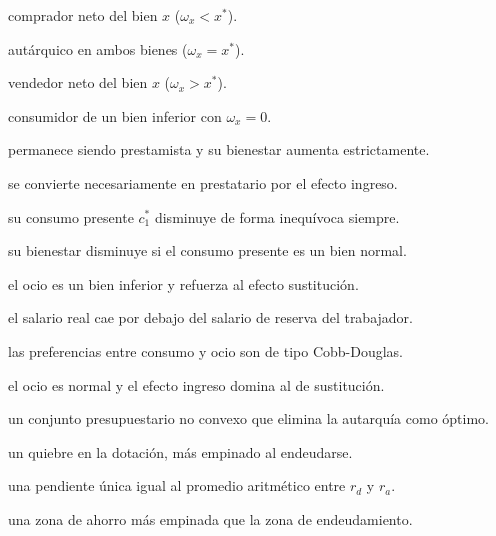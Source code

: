 \begin{opts}
    \item comprador neto del bien $x$ ($\omega_x < x^*$).
    \item autárquico en ambos bienes ($\omega_x = x^*$).
    \item vendedor neto del bien $x$ ($\omega_x > x^*$).
    \item consumidor de un bien inferior con $\omega_x = 0$.
\end{opts}

\begin{opts}
    \item permanece siendo prestamista y su bienestar aumenta estrictamente.
    \item se convierte necesariamente en prestatario por el efecto ingreso.
    \item su consumo presente $c_1^*$ disminuye de forma inequívoca siempre.
    \item su bienestar disminuye si el consumo presente es un bien normal.
\end{opts}

\begin{opts}
    \item el ocio es un bien inferior y refuerza al efecto sustitución.
    \item el salario real cae por debajo del salario de reserva del trabajador.
    \item las preferencias entre consumo y ocio son de tipo Cobb-Douglas.
    \item el ocio es normal y el efecto ingreso domina al de sustitución.
\end{opts}

\begin{opts}
    \item un conjunto presupuestario no convexo que elimina la autarquía como óptimo.
    \item un quiebre en la dotación, más empinado al endeudarse.
    \item una pendiente única igual al promedio aritmético entre $r_d$ y $r_a$.
    \item una zona de ahorro más empinada que la zona de endeudamiento.
\end{opts}

